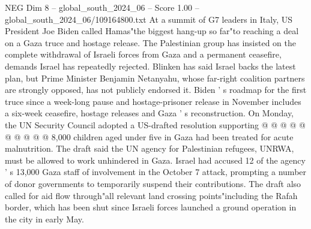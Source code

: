 \begin{textsample}{NEG Dim 8 – global\_south\_2024\_06 – Score 1.00 – global\_south\_2024\_06/109164800.txt}
At a summit of G7 leaders in Italy, US President Joe Biden called Hamas"the biggest hang-up so far"to reaching a deal on a Gaza truce and hostage release.
The Palestinian group has insisted on the complete withdrawal of Israeli forces from Gaza and a permanent ceasefire, demands Israel has repeatedly rejected.
Blinken has said Israel backs the latest plan, but Prime Minister Benjamin Netanyahu, whose far-right coalition partners are strongly opposed, has not publicly endorsed it.
Biden ' s roadmap for the first truce since a week-long pause and hostage-prisoner release in November includes a six-week ceasefire, hostage releases and Gaza ' s reconstruction.
On Monday, the UN Security Council adopted a US-drafted resolution supporting @ @ @ @ @ @ @ @ @ @ 8,000 children aged under five in Gaza had been treated for acute malnutrition.
The draft said the UN agency for Palestinian refugees, UNRWA, must be allowed to work unhindered in Gaza.
Israel had accused 12 of the agency ' s 13,000 Gaza staff of involvement in the October 7 attack, prompting a number of donor governments to temporarily suspend their contributions.
The draft also called for aid flow through"all relevant land crossing points"including the Rafah border, which has been shut since Israeli forces launched a ground operation in the city in early May.

\end{textsample}

